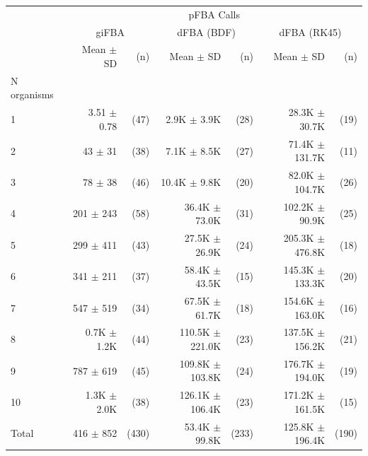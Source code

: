 \begin{tabular}{lrrrrrr}
\toprule
 & \multicolumn{6}{c}{pFBA Calls} \\
 & \multicolumn{2}{c}{giFBA} & \multicolumn{2}{c}{dFBA (BDF)} & \multicolumn{2}{c}{dFBA (RK45)} \\
 & Mean $\pm$ SD & (n) & Mean $\pm$ SD & (n) & Mean $\pm$ SD & (n) \\
N organisms &  &  &  &  &  &  \\
\midrule
1 & 3.51 $\pm$ 0.78 & (47) & 2.9K $\pm$ 3.9K & (28) & 28.3K $\pm$ 30.7K & (19) \\
2 & 43 $\pm$ 31 & (38) & 7.1K $\pm$ 8.5K & (27) & 71.4K $\pm$ 131.7K & (11) \\
3 & 78 $\pm$ 38 & (46) & 10.4K $\pm$ 9.8K & (20) & 82.0K $\pm$ 104.7K & (26) \\
4 & 201 $\pm$ 243 & (58) & 36.4K $\pm$ 73.0K & (31) & 102.2K $\pm$ 90.9K & (25) \\
5 & 299 $\pm$ 411 & (43) & 27.5K $\pm$ 26.9K & (24) & 205.3K $\pm$ 476.8K & (18) \\
6 & 341 $\pm$ 211 & (37) & 58.4K $\pm$ 43.5K & (15) & 145.3K $\pm$ 133.3K & (20) \\
7 & 547 $\pm$ 519 & (34) & 67.5K $\pm$ 61.7K & (18) & 154.6K $\pm$ 163.0K & (16) \\
8 & 0.7K $\pm$ 1.2K & (44) & 110.5K $\pm$ 221.0K & (23) & 137.5K $\pm$ 156.2K & (21) \\
9 & 787 $\pm$ 619 & (45) & 109.8K $\pm$ 103.8K & (24) & 176.7K $\pm$ 194.0K & (19) \\
10 & 1.3K $\pm$ 2.0K & (38) & 126.1K $\pm$ 106.4K & (23) & 171.2K $\pm$ 161.5K & (15) \\
Total & 416 $\pm$ 852 & (430) & 53.4K $\pm$ 99.8K & (233) & 125.8K $\pm$ 196.4K & (190) \\
\bottomrule
\end{tabular}
